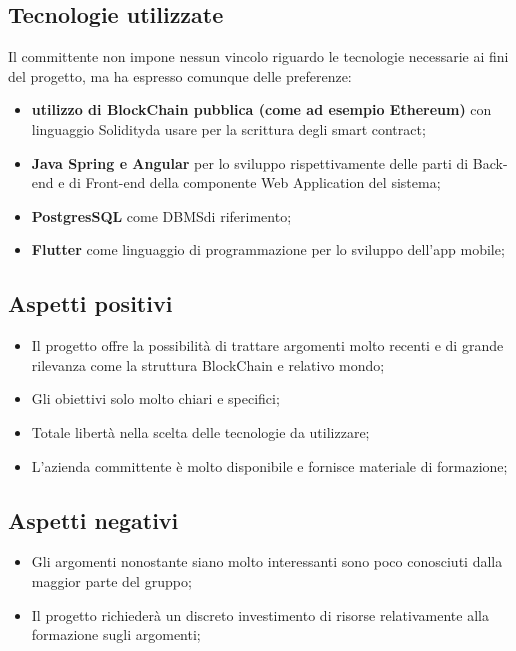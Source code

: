 \subsection{Tecnologie utilizzate}
Il committente non impone nessun vincolo riguardo le tecnologie necessarie ai fini del progetto, ma ha espresso comunque delle preferenze:
\begin{itemize}
	\item \textbf{utilizzo di BlockChain pubblica (come ad esempio Ethereum\glo)} con linguaggio Solidity\glo da usare per la scrittura degli {smart contract}\glo;
	\item \textbf{Java Spring e Angular} per lo sviluppo rispettivamente delle parti di Back-end e di Front-end della componente Web Application del sistema;
	\item \textbf{PostgresSQL} come DBMS\glo di riferimento;
	\item \textbf{Flutter} come linguaggio di programmazione per lo sviluppo dell'app mobile;
\end{itemize}

\subsection{Aspetti positivi}
\begin{itemize}
	\item Il progetto offre la possibilità di trattare argomenti molto recenti e di grande rilevanza come la struttura BlockChain e relativo mondo;
	\item Gli obiettivi solo molto chiari e specifici;
	\item Totale libertà nella scelta delle tecnologie da utilizzare;
	\item L'azienda committente è molto disponibile e fornisce materiale di formazione;
\end{itemize}

\subsection{Aspetti negativi}
\begin{itemize}
	\item Gli argomenti nonostante siano molto interessanti sono poco conosciuti dalla maggior parte del gruppo;
	\item Il progetto richiederà un discreto investimento di risorse relativamente alla formazione sugli argomenti;
\end{itemize}

